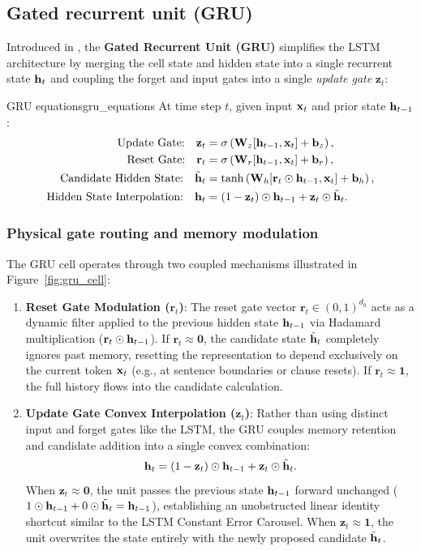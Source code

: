 \documentclass[../../main.tex]{subfiles}
\begin{document}
\subsection{Gated recurrent unit (GRU)}
Introduced in \cite{cho2014}, the \textbf{Gated Recurrent Unit (GRU)} simplifies the LSTM architecture by merging the cell state and hidden state into a single recurrent state $\mathbf{h}_t$ and coupling the forget and input gates into a single \emph{update gate} $\mathbf{z}_t$:

\begin{definition}{GRU equations}{gru_equations}
At time step $t$, given input $\mathbf{x}_t$ and prior state $\mathbf{h}_{t-1}$:
\begin{align}
\text{Update Gate:} \quad \mathbf{z}_t &= \sigma\left( \mathbf{W}_z [\mathbf{h}_{t-1}, \mathbf{x}_t] + \mathbf{b}_z \right), \label{eq:gru_update} \\
\text{Reset Gate:} \quad \mathbf{r}_t &= \sigma\left( \mathbf{W}_r [\mathbf{h}_{t-1}, \mathbf{x}_t] + \mathbf{b}_r \right), \label{eq:gru_reset} \\
\text{Candidate Hidden State:} \quad \tilde{\mathbf{h}}_t &= \tanh\left( \mathbf{W}_h [\mathbf{r}_t \odot \mathbf{h}_{t-1}, \mathbf{x}_t] + \mathbf{b}_h \right), \label{eq:gru_candidate} \\
\text{Hidden State Interpolation:} \quad \mathbf{h}_t &= (1 - \mathbf{z}_t) \odot \mathbf{h}_{t-1} + \mathbf{z}_t \odot \tilde{\mathbf{h}}_t. \label{eq:gru_hidden}
\end{align}
\end{definition}

\subsubsection{Physical gate routing and memory modulation}
The GRU cell operates through two coupled mechanisms illustrated in Figure~\ref{fig:gru_cell}:
\begin{enumerate}
    \item \textbf{Reset Gate Modulation ($\mathbf{r}_t$)}: The reset gate vector $\mathbf{r}_t \in (0, 1)^{d_h}$ acts as a dynamic filter applied to the previous hidden state $\mathbf{h}_{t-1}$ via Hadamard multiplication ($\mathbf{r}_t \odot \mathbf{h}_{t-1}$). If $\mathbf{r}_t \approx \mathbf{0}$, the candidate state $\tilde{\mathbf{h}}_t$ completely ignores past memory, resetting the representation to depend exclusively on the current token $\mathbf{x}_t$ (e.g., at sentence boundaries or clause resets). If $\mathbf{r}_t \approx \mathbf{1}$, the full history flows into the candidate calculation.
    \item \textbf{Update Gate Convex Interpolation ($\mathbf{z}_t$)}: Rather than using distinct input and forget gates like the LSTM, the GRU couples memory retention and candidate addition into a single convex combination:
    \[
    \mathbf{h}_t = (1 - \mathbf{z}_t) \odot \mathbf{h}_{t-1} + \mathbf{z}_t \odot \tilde{\mathbf{h}}_t.
    \]
    When $\mathbf{z}_t \approx \mathbf{0}$, the unit passes the previous state $\mathbf{h}_{t-1}$ forward unchanged ($1 \odot \mathbf{h}_{t-1} + 0 \odot \tilde{\mathbf{h}}_t = \mathbf{h}_{t-1}$), establishing an unobstructed linear identity shortcut similar to the LSTM Constant Error Carousel. When $\mathbf{z}_t \approx \mathbf{1}$, the unit overwrites the state entirely with the newly proposed candidate $\tilde{\mathbf{h}}_t$.
\end{enumerate}
\end{document}
